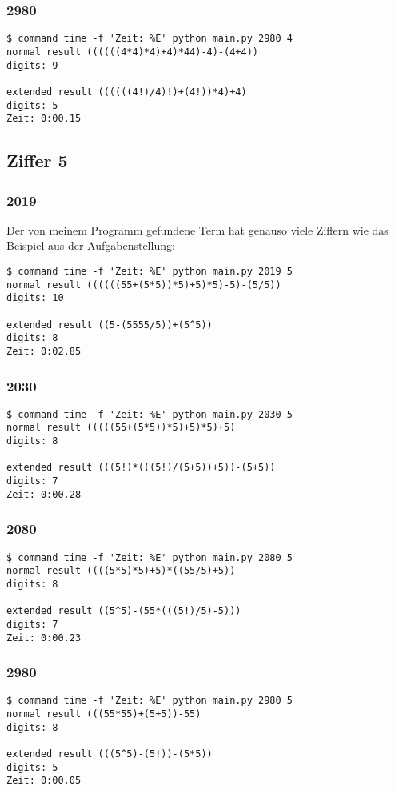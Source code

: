 \subsubsection{2980}
\begin{lstlisting}
$ command time -f 'Zeit: %E' python main.py 2980 4
normal result ((((((4*4)*4)+4)*44)-4)-(4+4))
digits: 9

extended result ((((((4!)/4)!)+(4!))*4)+4)
digits: 5
Zeit: 0:00.15
\end{lstlisting}
\subsection{Ziffer 5}
\subsubsection{2019}
Der von meinem Programm gefundene Term hat genauso viele Ziffern wie das Beispiel aus der Aufgabenstellung:
\begin{lstlisting}
$ command time -f 'Zeit: %E' python main.py 2019 5
normal result ((((((55+(5*5))*5)+5)*5)-5)-(5/5))
digits: 10

extended result ((5-(5555/5))+(5^5))
digits: 8
Zeit: 0:02.85
\end{lstlisting}
\subsubsection{2030}
\begin{lstlisting}
$ command time -f 'Zeit: %E' python main.py 2030 5
normal result (((((55+(5*5))*5)+5)*5)+5)
digits: 8

extended result (((5!)*(((5!)/(5+5))+5))-(5+5))
digits: 7
Zeit: 0:00.28
\end{lstlisting}
\subsubsection{2080}
\begin{lstlisting}
$ command time -f 'Zeit: %E' python main.py 2080 5
normal result ((((5*5)*5)+5)*((55/5)+5))
digits: 8

extended result ((5^5)-(55*(((5!)/5)-5)))
digits: 7
Zeit: 0:00.23
\end{lstlisting}
\subsubsection{2980}
\begin{lstlisting}
$ command time -f 'Zeit: %E' python main.py 2980 5
normal result (((55*55)+(5+5))-55)
digits: 8

extended result (((5^5)-(5!))-(5*5))
digits: 5
Zeit: 0:00.05
\end{lstlisting}

